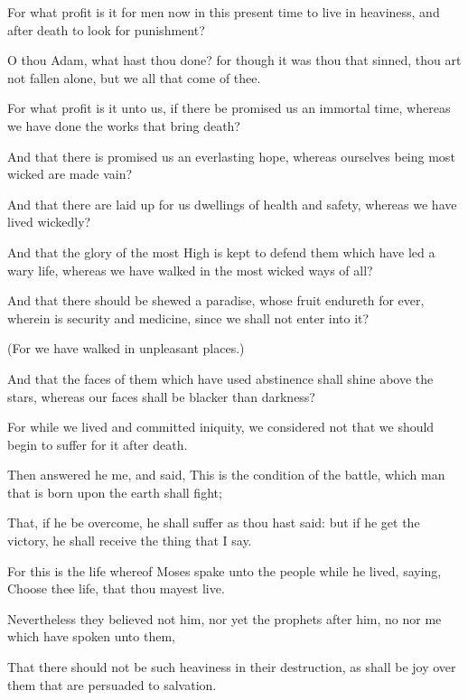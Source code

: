 {\par }{\PP {}For what profit is it for men now in this present time to live in heaviness, and after death to look for punishment?
\par }{\PP {}O thou Adam, what hast thou done? for though it was thou that sinned, thou art not fallen alone, but we all that come of thee.
\par }{\PP {}For what profit is it unto us, if there be promised us an immortal time, whereas we have done the works that bring death?
\par }{\PP {}And that there is promised us an everlasting hope, whereas ourselves being most wicked are made vain?
\par }{\PP {}And that there are laid up for us dwellings of health and safety, whereas we have lived wickedly?
\par }{\PP {}And that the glory of the most High is kept to defend them which have led a wary life, whereas we have walked in the most wicked ways of all?
\par }{\PP {}And that there should be shewed a paradise, whose fruit endureth for ever, wherein is security and medicine, since we shall not enter into it?
\par }{\PP {}(For we have walked in unpleasant places.)
\par }{\PP {}And that the faces of them which have used abstinence shall shine above the stars, whereas our faces shall be blacker than darkness?
\par }{\PP {}For while we lived and committed iniquity, we considered not that we should begin to suffer for it after death.
\par }{\PP {}Then answered he me, and said, This is the condition of the battle, which man that is born upon the earth shall fight;
\par }{\PP {}That, if he be overcome, he shall suffer as thou hast said: but if he get the victory, he shall receive the thing that I say.
\par }{\PP {}For this is the life whereof Moses spake unto the people while he lived, saying, Choose thee life, that thou mayest live.
\par }{\PP {}Nevertheless they believed not him, nor yet the prophets after him, no nor me which have spoken unto them,
\par }{\PP {}That there should not be such heaviness in their destruction, as shall be joy over them that are persuaded to salvation.
}
